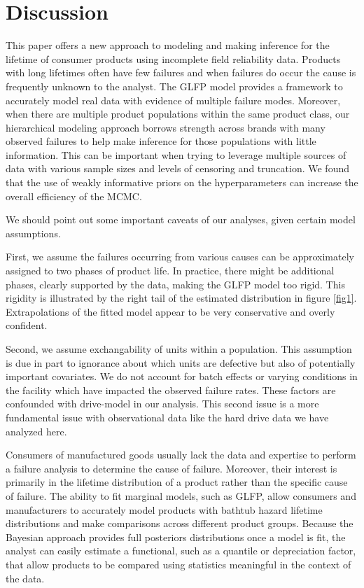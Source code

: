 \documentclass[12pt]{article}
\begin{document}
\section{Discussion}
\label{sec:Discussion}
This paper offers a new approach to modeling and making inference for the lifetime of consumer products using incomplete field reliability data.  Products with long lifetimes often have few failures and when failures do occur the cause is frequently unknown to the analyst.  The GLFP model provides a framework to accurately model real data with evidence of multiple failure modes. Moreover, when there are multiple product populations within the same product class, our hierarchical modeling approach borrows strength across brands with many observed failures to help make inference for those populations with little information.  This can be important when trying to leverage multiple sources of data with various sample sizes and levels of censoring and truncation.  We found that the use of weakly informative priors on the hyperparameters can increase the overall efficiency of the MCMC. %
  
We should point out some important caveats of our analyses, given certain model assumptions. 

First, we assume the failures occurring from various causes can be approximately assigned to two phases of product life.  In practice, there might be additional phases, clearly supported by the data, making the GLFP model too rigid. This rigidity is illustrated by the right tail of the estimated distribution in figure \ref{fig1}. Extrapolations of the fitted model appear to be very conservative and overly confident.

Second, we assume exchangability of units within a population. This assumption is due in part to ignorance about which units are defective but also of potentially important covariates. We do not account for batch effects or varying conditions in the facility which have impacted the observed failure rates. These factors are confounded with drive-model in our analysis. This second issue is a more fundamental issue with observational data like the hard drive data we have analyzed here.

Consumers of manufactured goods usually lack the data and expertise to perform a failure analysis to determine the cause of failure.  Moreover, their interest is primarily in the lifetime distribution of a product rather than the specific cause of failure.  The ability to fit marginal models, such as GLFP, allow consumers and manufacturers to accurately model products with bathtub hazard lifetime distributions and make comparisons across different product groups.  Because the Bayesian approach provides full posteriors distributions once a model is fit, the analyst can easily estimate a functional, such as a quantile or depreciation factor, that allow products to be compared using statistics meaningful in the context of the data. 
 
\end{document}
